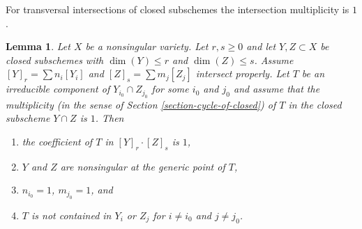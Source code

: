 \documentclass{stacks-project}
\theoremstyle{plain}
\newtheorem{lemma}[subsection]{Lemma}
\theoremstyle{definition}
\theoremstyle{remark}
\numberwithin{equation}{subsection}
\begin{document}
\noindent
For transversal intersections of closed subschemes the intersection
multiplicity is $1$.

\begin{lemma}
\label{lemma-transversal-subschemes}
Let $X$ be a nonsingular variety. Let $r, s \geq 0$ and let
$Y, Z \subset X$ be closed subschemes with $\dim(Y) \leq r$ and
$\dim(Z) \leq s$. Assume $[Y]_r = \sum n_i[Y_i]$ and
$[Z]_s = \sum m_j[Z_j]$ intersect properly.
Let $T$ be an irreducible component of $Y_{i_0} \cap Z_{j_0}$
for some $i_0$ and $j_0$ and assume that the multiplicity
(in the sense of Section \ref{section-cycle-of-closed}) of $T$
in the closed subscheme $Y \cap Z$ is $1$.
Then
\begin{enumerate}
\item the coefficient of $T$ in $[Y]_r \cdot [Z]_s$ is $1$,
\item $Y$ and $Z$ are nonsingular at the generic point of $T$,
\item $n_{i_0} = 1$, $m_{j_0} = 1$, and
\item $T$ is not contained in $Y_i$ or $Z_j$ for $i \not = i_0$ and
$j \not = j_0$.
\end{enumerate}
\end{lemma}
\end{document}

